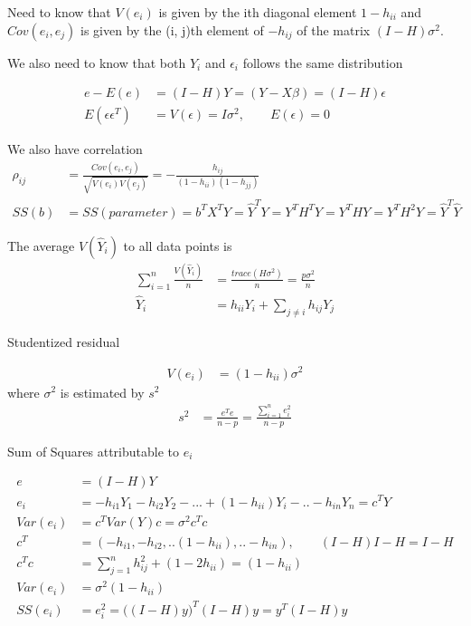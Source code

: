Need to know that $V(e_i)$ is given by the ith diagonal element $1 - h_{ii}$  and $Cov(e_i ,e_j )$ is given by the (i, j)th  element of $ -h_{ij}$ of the matrix $(I-H) \sigma^2$.

We also need to know that both $Y_i$ and $\epsilon_i$ follows the same distribution

\begin{align*}
	e - E(e) &= (I-H) Y = (Y- X\beta) = (I-H) \epsilon \\
	E(\epsilon \epsilon^T) &= V(\epsilon) = I\sigma^2 , \qquad E(\epsilon) = 0
\end{align*} 

We also have correlation
\begin{align*}
   \rho_{ij} &= \frac{Cov(e_i, e_j)}{\sqrt{V(e_i)V(e_j)}} = -\frac{h_{ij}}{(1-h_{ii}) (1-h_{jj})} \\
   SS(b) &= SS(parameter) = b^T X^T Y = \hat{Y}^T Y = Y^T H^T Y =  Y^T H Y =  Y^T H^2 Y = \hat{Y}^T \hat{Y}
\end{align*} 

The average $V(\hat{Y}_i)$ to all data points is
\begin{align*}
	\sum_{i=1}^n \frac{V(\hat{Y}_i)}{n} &= \frac{trace(H \sigma^2)}{n} = \frac{p \sigma^2}{n} \\
	\hat{Y}_i &= h_{ii}Y_i + \sum_{j \neq i} h_{ij} Y_j
\end{align*} 

Studentized residual

\begin{align*}
	 V(e_i) & = (1- h_{ii}) \sigma^2 
\end{align*} 
where $\sigma^2$ is estimated by $s^2$
\begin{align*}
 s^2 & = \frac{e^T e}{n-p} = \frac{\sum_{i=1}^n e_i^2}{n-p}
\end{align*} 

Sum of Squares attributable to $e_i$

\begin{align*}
	e & = (I-H)Y\\
	e_i &= -h_{i1} Y_1 - h_{i2} Y_2 - ... + (1- h_{ii}) Y_i -.. -h_{in} Y_n = c^T Y\\
	Var(e_i) &= c^T Var(Y) c = \sigma^2 c^T c \\
	c^T &= ( -h_{i1}, - h_{i2}, ..  (1- h_{ii}), .. -h_{in}), \qquad (I-H) I-H = I-H\\
	c^T c &= \sum_{j=1}^n h_{ij}^2 + (1- 2h_{ii}) = (1-h_{ii})\\
	Var(e_i) &=  \sigma^2 (1-h_{ii}) \\
	SS(e_i) &= {e_i^2} = \Big((I-H)y\Big)^T (I-H)y = y^T (I-H) y
\end{align*} 

